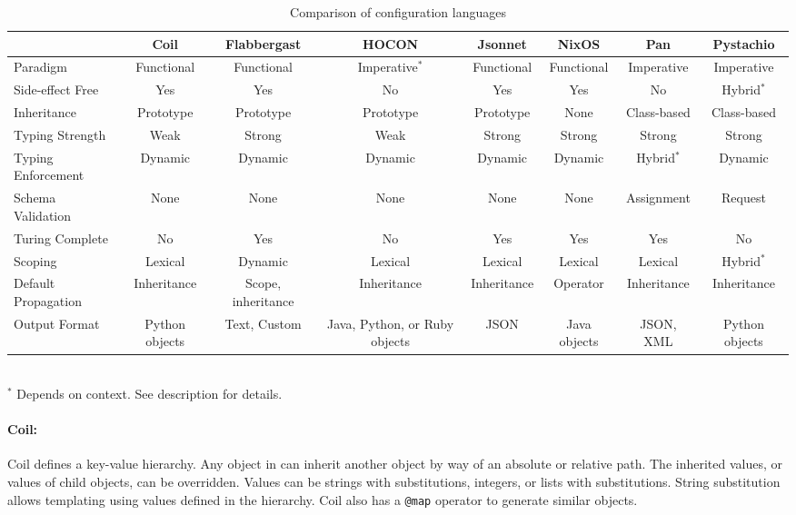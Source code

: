 \documentclass[letterpaper,twocolumn,10pt]{article}
\begin{document}
\begin{table*}
\caption{\label{tbl:features}Comparison of configuration languages}
\scriptsize
\begin{tabular}{lccccccc}
\hline
										& Coil						& Flabbergast					& HOCON					& Jsonnet			& NixOS				& Pan & Pystachio \\\hline
Paradigm						& Functional			& Functional					& Imperative$^*$&	Functional	& Functional	& Imperative			& Imperative \\
Side-effect Free		& Yes							& Yes									& No						&	Yes					& Yes					& No							& Hybrid$^*$ \\
Inheritance					& Prototype				& Prototype						& Prototype			&	Prototype		& None				& Class-based			& Class-based \\
Typing Strength			& Weak						& Strong							& Weak					&	Strong			& Strong			& Strong					& Strong \\
Typing Enforcement	& Dynamic					& Dynamic							&	Dynamic				&	Dynamic			& Dynamic			& Hybrid$^*$			& Dynamic \\
Schema Validation		& None						& None								& None					& None				& None				& Assignment			& Request \\
Turing Complete			& No							& Yes									& No						& Yes					& Yes					& Yes							& No \\
Scoping							& Lexical					& Dynamic							& Lexical				& Lexical			& Lexical			& Lexical					& Hybrid$^*$ \\
Default Propagation	& Inheritance			&	Scope, inheritance	& Inheritance		& Inheritance	& Operator		& Inheritance			& Inheritance \\
Output Format				& Python objects	&	Text, Custom				& Java, Python, or Ruby objects		& JSON				& Java objects			& JSON, XML				& Python objects \\
\hline
\end{tabular}\\
$^*$ Depends on context. See description for details.
\end{table*}

\paragraph{Coil:}
Coil defines a key-value hierarchy. Any object in can inherit another object by way of an absolute or relative path. The inherited values, or values of child objects, can be overridden. Values can be strings with substitutions, integers, or lists with substitutions. String substitution allows templating using values defined in the hierarchy. Coil also has a \texttt{@map} operator to generate similar objects.
\end{document}
